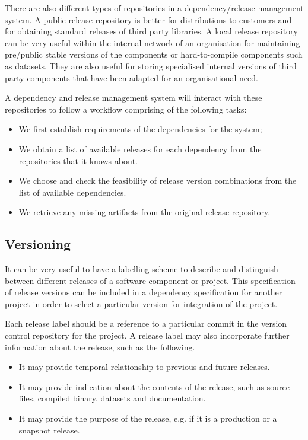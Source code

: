 \documentclass[a4paper, openany]{memoir}
\begin{document}
There are also different types of repositories in a dependency/release management system. A public release repository is better for distributions to customers and for obtaining standard releases of third party libraries. A local release repository can be very useful within the internal network of an organisation for maintaining pre/public stable versions of the components or hard-to-compile components such as datasets. They are also useful for storing specialised internal versions of third party components that have been adapted for an organisational need.

A dependency and release management system will interact with these repositories to follow a workflow comprising of the following tasks:
\begin{itemize}
    \item We first establish requirements of the dependencies for the system;
    \item We obtain a list of available releases for each dependency from the repositories that it knows about.
    \item We choose and check the feasibility of release version combinations from the list of available dependencies. 
    \item We retrieve any missing artifacts from the original release repository.
\end{itemize}

\subsection{Versioning}
It can be very useful to have a labelling scheme to describe and distinguish between different releases of a software component or project. This specification of release versions can be included in a dependency specification for another project in order to select a particular version for integration of the project.

Each release label should be a reference to a particular commit in the version control repository for the project. A release label may also incorporate further information about the release, such as the following.
\begin{itemize}
    \item It may provide temporal relationship to previous and future releases.
    \item It may provide indication about the contents of the release, such as source files, compiled binary, datasets and documentation.
    \item It may provide the purpose of the release, e.g. if it is a production or a snapshot release.
\end{itemize}
\end{document}
